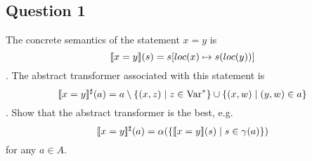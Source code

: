 \subsection{Question 1}
The concrete semantics of the statement $x=y$ is
\begin{equation*}
[\![x=y]\!](s)=s[loc(x)\mapsto s(loc(y))]
\end{equation*}
. The abstract transformer associated with this statement is
\begin{equation*}
[\![x=y]\!]^\sharp(a) = a \setminus \{(x,z) \mid z\in \text{Var}^*\}\cup\{(x,w)\mid(y,w)\in a\}
\end{equation*}
. Show that the abstract transformer is the best, e.g.
\begin{equation*}
[\![x=y]\!]^\sharp(a)=\alpha(\{[\![x=y]\!](s)\mid s\in \gamma(a)\})
\end{equation*} for any $a \in A$.
